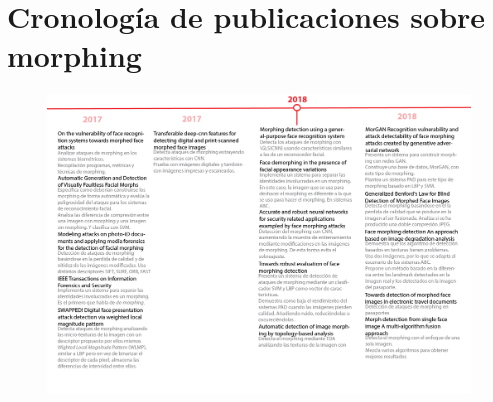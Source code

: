 






\chapter{Cronología de publicaciones sobre morphing}\label{apendix:ApendiceCronologiaMorphing}

\begin{landscape}
 \begin{figure}
  \centering
  \includegraphics[width=1.4\textwidth]{ch-sistemasABC/images/ch-ImagenesApendices/CRONOLOGIA_MORPHING-02.png}
  \label{fig:01_CRONOLOGIA_MORPHING}
 \end{figure}
\end{landscape}

